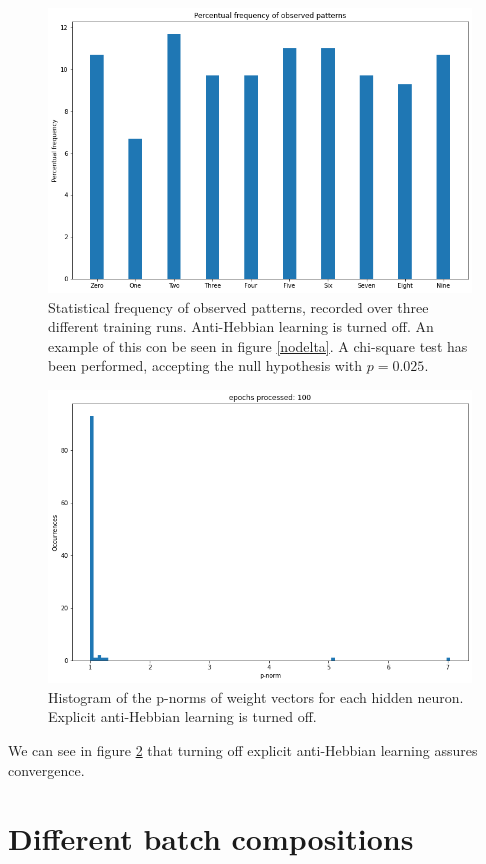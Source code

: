 \documentclass[a4paper]{report}
\begin{document}
\begin{figure} [H]
	\centering
	\includegraphics [width=12cm ] {o/bar1.png}
	\caption{Statistical frequency of observed patterns, recorded over three different training runs. Anti-Hebbian learning is turned off. An example of this con be seen in figure \ref{nodelta}. A chi-square test has been performed, accepting the null hypothesis with $p  = 0.025$.}
	\label{o/cerchio2}
\end{figure}

\begin{figure} [H]
	\centering
	\includegraphics [width=12cm ] {o/ii_hist.png}
	\caption{Histogram of the p-norms of weight vectors for each hidden neuron. Explicit anti-Hebbian learning is turned off.}
	\label{noh_hist}
\end{figure}

We can see in figure \ref{noh_hist} that turning off explicit anti-Hebbian learning assures convergence.

\section{Different batch compositions}
\end{document}
